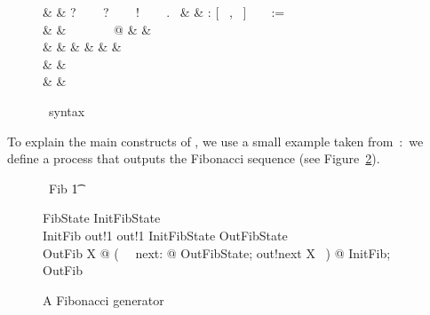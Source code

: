 \documentclass{article}
\begin{document}
\begin{figure}[t]
\begin{syntax}
     & %
    \mathsf{::=} & ?~ %
    \ \mathsf{|} \ ?~ %
    \ \mathsf{|} \ !~ %
    \ \mathsf{|} \ .~
    \also %
     & %
    \mathsf{::=} &  : [~  ,
     ~] %
    \ \mathsf{|} \  := 
    \\ %
    & \mathsf{|} & \circif\ \ \circfi
    \ \mathsf{|} \ \circvar\  @ 
    \also %
     & %
    \mathsf{::=} &  \then {} %
    \\ %
    & \mathsf{|} &  \then {} \extchoice
    \also %
     & %
    \mathsf{::=} & 
    \also %
     & %
    \mathsf{::=} & \mathsf{ \{ ~ \}} %
    \ \mathsf{|} \  %
    \ \mathsf{|} \ 
    \\ %
    & \mathsf{|} &  %
    \ \mathsf{|} \ 
    \\ %
    & \mathsf{|} & 
    \also %
  \end{syntax}
  \caption{\Circus\ syntax}
  \label{CircusSyntax2}
\end{figure}

To explain the main constructs of \Circus, we use a small example
taken from~\cite{Hoa85}:~we define a process that outputs the
Fibonacci sequence (see Figure~\ref{fibonacciGenerator}).
\begin{figure}[t]
  \begin{zed}
    \circprocess\ Fib  \circbegin
    \also %
    \t1
    \begin{block}
      FibState 
      \also %
      InitFibState 
      \\ %
      InitFib  out!1 \then out!1 \then InitFibState
      \also %
      OutFibState 
      \\
      OutFib  \mu X @ (~ \circvar\ next: \nat @ OutFibState;
      out!next \then X ~)
      \also %
      @ InitFib; OutFib
    \end{block}
    \also %
    \circend
  \end{zed}
  \caption{A Fibonacci generator}
  \label{fibonacciGenerator}
\end{figure}
\end{document}

